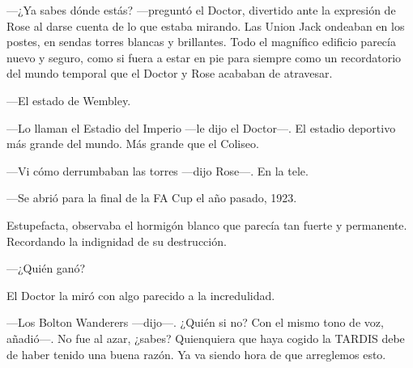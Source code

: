 {---¿Ya sabes dónde estás? ---preguntó el Doctor, divertido ante la
	expresión de Rose al darse cuenta de lo que estaba mirando. Las Union
	Jack ondeaban en los postes, en sendas torres blancas y brillantes. Todo
	el magnífico edificio parecía nuevo y seguro, como si fuera a estar en
	pie para siempre como un recordatorio del mundo temporal que el Doctor y
Rose acababan de atravesar.}

{---El estado de Wembley.}

{---Lo llaman el Estadio del Imperio ---le dijo el Doctor---. El estadio
deportivo más grande del mundo. Más grande que el Coliseo.}

{---Vi cómo derrumbaban las torres ---dijo Rose---. En la tele.}

{---Se abrió para la final de la FA Cup el año pasado, 1923.}

{Estupefacta, observaba el hormigón blanco que parecía tan fuerte y
permanente. Recordando la indignidad de su destrucción.}

{---¿Quién ganó?}

{El Doctor la miró con algo parecido a la incredulidad.}

{---Los Bolton Wanderers ---dijo---. ¿Quién si no? Con el mismo tono de
	voz, añadió---. No fue al azar, ¿sabes? Quienquiera que haya cogido la
	TARDIS debe de haber tenido una buena razón. Ya va siendo hora de que
arreglemos esto.}
